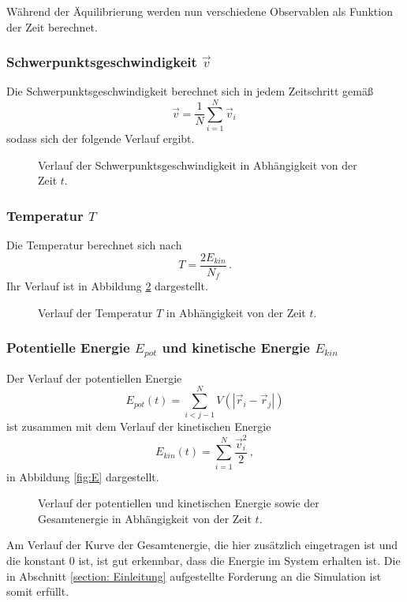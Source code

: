 Während der Äquilibrierung werden nun verschiedene Observablen als Funktion der Zeit berechnet.
\subsubsection*{Schwerpunktsgeschwindigkeit $\vec{v}$}
Die Schwerpunktsgeschwindigkeit berechnet sich in jedem Zeitschritt gemäß
\begin{equation*}
    \vec{v} = \frac{1}{N} \sum_{i = 1}^{N} \vec{v}_i \, 
\end{equation*}
sodass sich der folgende Verlauf ergibt.
\FloatBarrier
\begin{figure}[H]
    \centering
    \caption{Verlauf der Schwerpunktsgeschwindigkeit in Abhängigkeit von der Zeit $t$.}
    \label{fig:v}
\end{figure}
\FloatBarrier
\noindent
\subsubsection*{Temperatur $T$}
Die Temperatur berechnet sich nach
\begin{equation*}
    T = \frac{2 E_{kin}}{N_f} \, .
\end{equation*}
Ihr Verlauf ist in Abbildung \ref{fig:T} dargestellt.
\FloatBarrier
\begin{figure}[H]
    \centering
    \caption{Verlauf der Temperatur $T$ in Abhängigkeit von der Zeit $t$.}
    \label{fig:T}
\end{figure}
\FloatBarrier
\noindent
\subsubsection*{Potentielle Energie $E_{pot}$ und kinetische Energie $E_{kin}$}
Der Verlauf der potentiellen Energie 
\begin{equation*}
    E_{pot}(t) = \sum_{i < j-1}^{N} V\left(\left|\vec{r}_i - \vec{r}_j\right|\right)
\end{equation*}
ist zusammen mit dem Verlauf der kinetischen Energie
\begin{equation*}
   E_{kin}(t) = \sum_{i = 1}^{N} \frac{\vec{v}_i^2}{2} \, ,
\end{equation*}
in Abbildung \ref{fig:E} dargestellt.
\FloatBarrier
\begin{figure}[H]
    \centering
    \caption{Verlauf der potentiellen und kinetischen Energie sowie der Gesamtenergie in Abhängigkeit von der Zeit $t$.}
    \label{fig:V}
\end{figure}
\FloatBarrier
\noindent
Am Verlauf der Kurve der Gesamtenergie, die hier zusätzlich eingetragen ist und die konstant 0 ist, ist gut erkennbar, dass die Energie im System erhalten ist.
Die in Abschnitt \ref{section: Einleitung} aufgestellte Forderung an die Simulation ist somit erfüllt.


